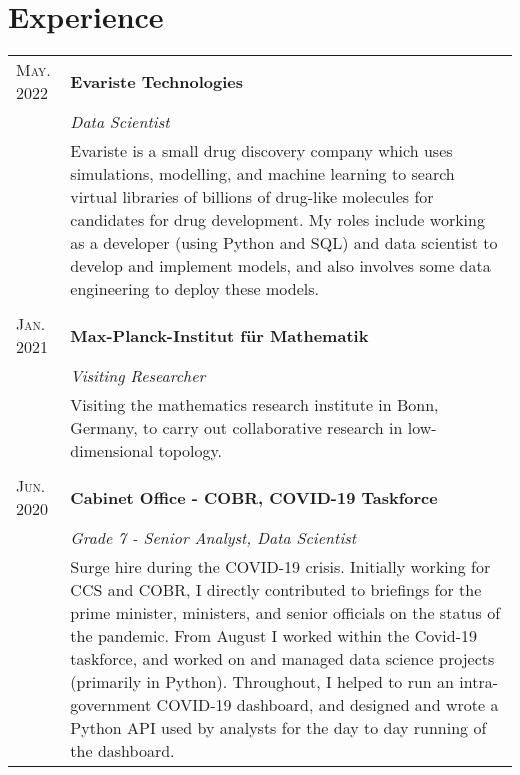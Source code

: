 \documentclass[a4paper]{article}
\makeatletter
\newcommand{\tablebreak}{\multicolumn{2}{c}{} \\}
\newlength{\datelength}
\newenvironment{datejobtable}{\begin{tabular}{@{} >{\raggedleft}p{\datelength} | p{\linewidth- \datelength - 2\tabcolsep - \arrayrulewidth} @{}}}{\end{tabular}}
\newcommand{\job}[5][]{

\textsc{#2} \ifthenelse{\equal{#3}{}}{}{to}  & \textbf{#4}\\
\ifthenelse{\equal{#3}{Present}}{Present}{\textsc{#3}}\ifthenelse{\equal{#1}{}}{}{&\textit{#1}\\}&\small #5\\
}
\newcommand{\subjob}[2][]{
\ifthenelse{\equal{#1}{}}{}{&\textit{#1}\\}&\small #2\\
}
\makeatother
\begin{document}
\section*{Experience}
\begin{datejobtable}

\job[Data Scientist]{May. 2022}{Present}{Evariste Technologies}{Evariste is a small drug discovery company which uses simulations, modelling, and machine learning to search virtual libraries of billions of drug-like molecules for candidates for drug development. My roles include working as a developer (using Python and SQL) and data scientist to develop and implement models, and also involves some data engineering to deploy these models.}

\tablebreak

\job[Visiting Researcher]{Jan. 2021}{Mar. 2021}{Max-Planck-Institut f\"ur Mathematik}{Visiting the mathematics research institute in Bonn, Germany, to carry out collaborative research in low-dimensional topology.}

\tablebreak

\job[Grade 7 - Senior Analyst, Data Scientist]{Jun. 2020}{Dec. 2020}{Cabinet Office - COBR, COVID-19 Taskforce}{Surge hire during the COVID-19 crisis. Initially working for CCS and COBR, I directly contributed to briefings for the prime minister, ministers, and senior officials on the status of the pandemic. From August I worked within the Covid-19 taskforce, and worked on and managed data science projects (primarily in Python). Throughout, I helped to run an intra-government COVID-19 dashboard, and designed and wrote a Python API used by analysts for the day to day running of the dashboard.}



\end{datejobtable}
\end{document}
